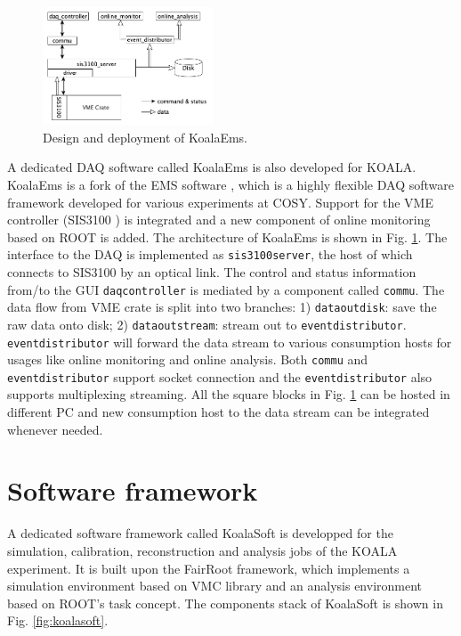 \documentclass[number,5p]{elsarticle}
\begin{document}
\begin{figure}[htbp]
\centering
\includegraphics[width=0.45\textwidth]{./koalaems_deployment.png}
\caption{Design and deployment of KoalaEms.}
\label{fig:koalaems}
\end{figure}

A dedicated DAQ software called KoalaEms is also developed for KOALA.
KoalaEms is a fork of the EMS software \cite{ems}, which is a highly flexible DAQ software framework developed for various experiments at COSY.
Support for the VME controller (SIS3100 \cite{sis}) is integrated and a new component of online monitoring based on ROOT is added.
The architecture of KoalaEms is shown in Fig. \ref{fig:koalaems}.
The interface to the DAQ is implemented as \linebreak\texttt{sis3100\textunderscore server}, the host of which
connects to SIS3100 by an optical link.
The control and status information from/to the GUI \texttt{daq\textunderscore controller} is mediated by a component called \texttt{commu}.
The data flow from VME crate is split into two branches: 1) \texttt{data\textunderscore out\textunderscore disk}: save the raw data onto disk; 2) \texttt{data\textunderscore out\textunderscore stream}: stream out to \texttt{event\textunderscore distributor}.
\texttt{event\textunderscore distributor} will forward the data stream to various consumption hosts for usages like online monitoring and online analysis.
Both \texttt{commu} and \texttt{event\textunderscore distributor} support socket connection and the \texttt{event\textunderscore distributor} also supports multiplexing streaming.
All the square blocks in Fig. \ref{fig:koalaems} can be hosted in different PC and new consumption host to the data stream can be integrated whenever needed.


\section{Software framework}
\label{sec:software}

A dedicated software framework called KoalaSoft is developped for the simulation, calibration, reconstruction and analysis jobs of the KOALA experiment.
It is built upon the FairRoot \cite{fairroot} framework, which implements a simulation environment based on VMC \cite{vmc} library and an analysis environment based on ROOT's task concept.
The components stack of KoalaSoft is shown in Fig. \ref{fig:koalasoft}.
\end{document}

